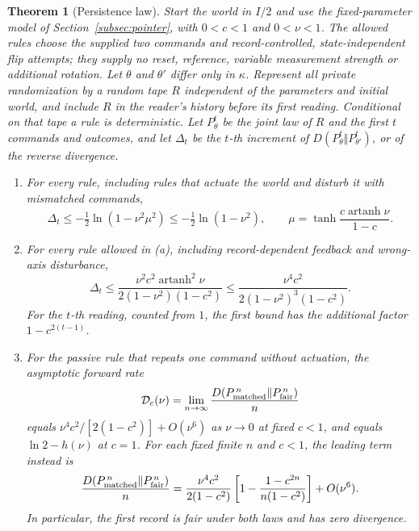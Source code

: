 \documentclass[11pt,a4paper]{article}
\newtheorem{theorem}[definition]{Theorem}
\newcommand{\artanh}{\operatorname{artanh}}
\begin{document}
\begin{theorem}[Persistence law]\label{thm:rate}
Start the world in $I/2$ and use the fixed-parameter model of Section~\ref{subsec:pointer}, with $0<c<1$ and $0<\nu<1$. The allowed rules choose the supplied two commands and record-controlled, state-independent flip attempts; they supply no reset, reference, variable measurement strength or additional rotation. Let $\theta$ and $\theta'$ differ only in $\kappa$. Represent all private randomization by a random tape $R$ independent of the parameters and initial world, and include $R$ in the reader's history before its first reading. Conditional on that tape a rule is deterministic. Let $P^t_\theta$ be the joint law of $R$ and the first $t$ commands and outcomes, and let $\Delta_t$ be the $t$-th increment of $D(P^t_\theta\Vert P^t_{\theta'})$, or of the reverse divergence.
\begin{enumerate}
\item[(a)] For every rule, including rules that actuate the world and disturb it with mismatched commands,
\[
 \Delta_t\le-\tfrac12\ln(1-\nu^2\mu^2)\le-\tfrac12\ln(1-\nu^2),\qquad
 \mu=\tanh\frac{c\artanh\nu}{1-c}.
\]
\item[(b)] For every rule allowed in (a), including record-dependent feedback and wrong-axis disturbance,
\begin{equation}\label{eq:rate}
 \Delta_t\le\frac{\nu^2c^2\artanh^2\nu}{2(1-\nu^2)(1-c^2)}
 \le\frac{\nu^4c^2}{2(1-\nu^2)^3(1-c^2)}.
\end{equation}
For the $t$-th reading, counted from $1$, the first bound has the additional factor $1-c^{2(t-1)}$.
\item[(c)] For the passive rule that repeats one command without actuation, the asymptotic forward rate
\[
 \mathcal D_c(\nu)=\lim_{n\to\infty}
 \frac{D(P_{\rm matched}^{\,n}\Vert P_{\rm fair}^{\,n})}{n}
\]
equals $\nu^4c^2/[2(1-c^2)]+O(\nu^6)$ as $\nu\to0$ at fixed $c<1$,
and equals $\ln2-h(\nu)$ at $c=1$. For each fixed finite $n$ and $c<1$,
the leading term instead is
\[
 \frac{D(P_{\rm matched}^{\,n}\Vert P_{\rm fair}^{\,n})}{n}
 =\frac{\nu^4c^2}{2(1-c^2)}
  \left[1-\frac{1-c^{2n}}{n(1-c^2)}\right]+O(\nu^6).
\]
In particular, the first record is fair under both laws and has zero divergence.
\end{enumerate}
\end{theorem}
\end{document}
